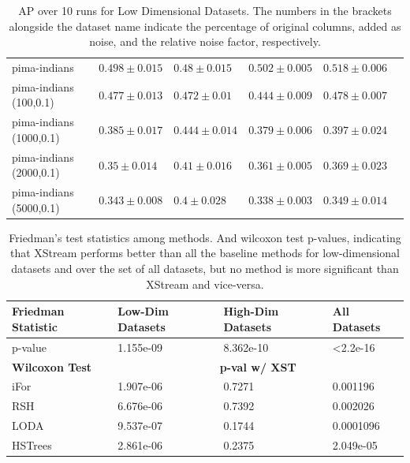 \begin{footnotesize}
\begin{table}[ht!]
\begin{tabular}{llllll}
\midrule
pima-indians& $0.498 \pm 0.015$ &  $0.48 \pm 0.015$ &  $0.502 \pm 0.005$ &  $0.518 \pm 0.006$    \\
pima-indians (100,0.1)& $0.477 \pm 0.013$ &  $0.472 \pm 0.01$ &  $0.444 \pm 0.009$ &  $0.478 \pm 0.007$    \\
pima-indians (1000,0.1)& $0.385 \pm 0.017$ &  $0.444 \pm 0.014$ &  $0.379 \pm 0.006$ &  $0.397 \pm 0.024$    \\
pima-indians (2000,0.1)& $0.35 \pm 0.014$ &  $0.41 \pm 0.016$ &  $0.361 \pm 0.005$ &  $0.369 \pm 0.023$    \\
pima-indians (5000,0.1)& $0.343 \pm 0.008$ &  $0.4 \pm 0.028$ &  $0.338 \pm 0.003$ &  $0.349 \pm 0.014$    \\
				\bottomrule
		\end{tabular}
		\caption{AP over 10 runs for Low Dimensional Datasets. The numbers in the brackets alongside the dataset name indicate the percentage of original columns, added as noise, and the relative noise factor, respectively.}
\end{table}
\end{footnotesize}


\begin{table}[]
\centering
\begin{tabular}{l|lll}
\hline	\hline
\textbf{Friedman Statistic} & \textbf{Low-Dim Datasets} & \textbf{High-Dim Datasets} & \textbf{All Datasets}    \\ \hline
p-value            & 1.155e-09        & 8.362e-10         & \textless2.2e-16 \\ \hline \hline
\textbf{Wilcoxon Test}      & \multicolumn{3}{c}{\textbf{p-val w/ XST}}                        \\ 	\hline
iFor               & 1.907e-06         & 0.7271         &  0.001196       \\
RSH                & 6.676e-06         & 0.7392         & 0.002026        \\
LODA               & 9.537e-07         & 0.1744         & 0.0001096            \\
HSTrees            & 2.861e-06        & 0.2375          &  2.049e-05	\\	\hline
\end{tabular}
\caption{Friedman's test statistics among methods. And wilcoxon test p-values, indicating that XStream performs better than all the baseline methods for low-dimensional datasets and over the set of all datasets, but no method is more significant than XStream and vice-versa.}
\label{my-label}
\end{table}

